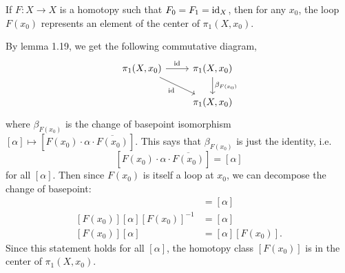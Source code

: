 \documentclass[twoside,10pt]{article}
\begin{document}
\newpage

\begin{exer}[1.1: 20]
	If $F:X\to X$ is a homotopy such that $F_0=F_1=\operatorname{id}_{X}$, then for any $x_0$, the loop $F(x_0)$ represents an element of the center of $\pi_1(X,x_0).$
\end{exer}

By lemma 1.19, we get the following commutative diagram,
\[
\begin{tikzcd}
	\pi_1(X,x_0) \rar{\id_{}} \arrow[dr, "\id_{}"'] & \pi_1(X,x_0) \dar{\beta_{F(x_0)}} \\
	& \pi_1(X,x_0)
\end{tikzcd}
\] 
where $\beta_{F(x_0)}$ is the change of basepoint isomorphism $[\alpha] \mapsto [F(x_0) \cdot \alpha \cdot \overline{F(x_0)}]$.
This says that $\beta_{F(x_0)}$ is just the identity, i.e.
\[
[F(x_0) \cdot \alpha \cdot \overline{F(x_0)}] = [\alpha]
\] for all $[\alpha]$. Then since $F(x_0)$ is itself a loop at $x_0$, we can decompose the change of basepoint:
\begin{align*}
	[F(x_0) \cdot \alpha \cdot \overline{F(x_0)}] &= [\alpha] \\
	[F(x_0)] [\alpha] [F(x_0)]^{-1} &= [\alpha] \\
	[F(x_0)] [\alpha] &= [\alpha] [F(x_0)].
\end{align*}
Since this statement holds for all $[\alpha]$, the homotopy class $[F(x_0)]$ is in the center of $\pi_1(X,x_0)$.

\newpage
\end{document}
